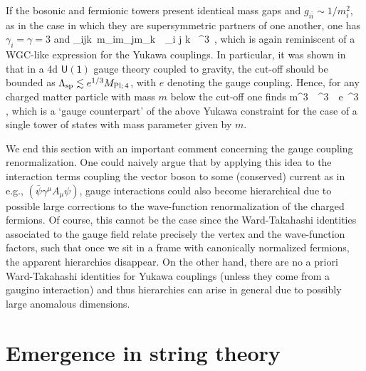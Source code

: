 If the bosonic and fermionic towers present identical mass gaps and $g_{i \bar i}\sim 1/m_i^2$, as in the case in which they are supersymmetric partners of one another, one has $\gamma_i=\gamma=3$ and 
%
\beq
	_{ijk}\, m_im_jm_k\, \lesssim\, _{i j k} \, \Mpf^3\, ,
\eeq	
%
which is again reminiscent of a WGC-like expression for the Yukawa couplings. In particular, it was shown in \cite{Heidenreich:2017sim} that in a 4d $\mathsf{U(1)}$ gauge theory coupled to gravity, the cut-off should be bounded as $\Lambda_{\text{sp}} \lesssim e^{1/3}M_{\text{Pl;}\, 4}$, with $e$ denoting the gauge coupling. Hence, for any charged matter particle with mass $m$ below the cut-off one finds
%
\beq
	m^3\, \lesssim\, \LSP^3\, \lesssim\, e\, \Mpf^3\, ,
\eeq
%
which is a `gauge counterpart' of the above Yukawa constraint for the case of a single tower of states with mass parameter given by $m$. %
	
We end this section with an important comment concerning the gauge coupling renormalization. One could naively argue that by applying this idea to the interaction terms coupling the vector boson to some (conserved) current as in e.g., $({\bar \psi}\gamma^\mu A_\mu \psi)$, gauge interactions could also become hierarchical due to possible large corrections to the wave-function renormalization of the charged fermions. Of course, this cannot be the case since the Ward-Takahashi identities associated to the gauge field relate precisely the vertex and the wave-function factors, such that once we sit in a frame with canonically normalized fermions, the apparent hierarchies disappear. On the other hand, there are no a priori Ward-Takahashi identities for Yukawa couplings (unless they come from a gaugino interaction) and thus hierarchies can arise in general due to possibly large anomalous dimensions. 

\section{Emergence in string theory}\label{s:EmergenceStringTheory}


